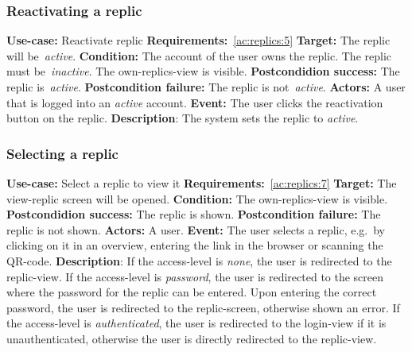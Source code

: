 \subsubsection{Reactivating a replic}\label{subsubsec:reactivate-replic}
\textbf{Use-case:} Reactivate replic \newline
\textbf{Requirements:}~\ref{ac:replics:5} \newline
\textbf{Target:} The replic will be~\textit{active}. \newline
\textbf{Condition:} The account of the user owns the replic.
The replic must be~\textit{inactive}.
The own-replics-view is visible. \newline
\textbf{Postcondidion success:} The replic is~\textit{active}. \newline
\textbf{Postcondition failure:} The replic is not~\textit{active}. \newline
\textbf{Actors:} A user that is logged into an \textit{active} account. \newline
\textbf{Event:} The user clicks the reactivation button on the replic. \newline
\textbf{Description}: The system sets the replic to \textit{active}.

\subsubsection{Selecting a replic}\label{subsubsec:select-replic}
\textbf{Use-case:} Select a replic to view it \newline
\textbf{Requirements:}~\ref{ac:replics:7} \newline
\textbf{Target:} The view-replic screen will be opened. \newline
\textbf{Condition:} The own-replics-view is visible. \newline
\textbf{Postcondidion success:} The replic is shown. \newline
\textbf{Postcondition failure:} The replic is not shown. \newline
\textbf{Actors:} A user. \newline
\textbf{Event:} The user selects a replic, e.g.\ by clicking on it in an overview, entering the link in the browser or scanning the QR-code. \newline
\textbf{Description}: If the access-level is \textit{none}, the user is redirected to the replic-view.
If the access-level is \textit{password}, the user is redirected to the screen where the password for the replic can be entered.
Upon entering the correct password, the user is redirected to the replic-screen, otherwise shown an error.
If the access-level is \textit{authenticated}, the user is redirected to the login-view if it is unauthenticated, otherwise the user is directly redirected to the replic-view.

